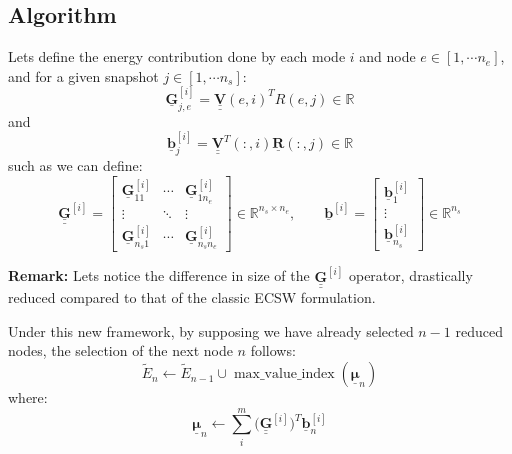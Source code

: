 \documentclass[a4paper,12pt]{article}
\newcommand{\vect}[1]{\underline{\boldsymbol{#1}}}
\newcommand{\matr}[1]{\underline{\underline{\boldsymbol{#1}}}}
\begin{document}
\subsection{Algorithm}
Lets define the energy contribution done by each mode $i$ and node $e\in[1,\cdots n_e]$, and for a given snapshot $j\in[1,\cdots n_s]$:
\begin{equation}
\vect{G}_{j,e}^{[i]}=\matr{V}(e,i)^{T}R(e,j)\in\mathbb{R}
\label{eq:bm-node-contribution}
\end{equation}
and
\begin{equation}
\vect{b}_j^{[i]}=\matr{V}^{T}(:,i)\vect{R}(:,j)\in\mathbb{R}
\label{eq:bm-target}
\end{equation}
such as we can define:
\[
\matr{G}^{[i]}=
\begin{bmatrix}
\vect{G}_{11}^{[i]} & \cdots & \vect{G}_{1n_e}^{[i]}\\
\vdots & \ddots & \vdots\\
\vect{G}_{n_s1}^{[i]} & \cdots & \vect{G}_{n_sn_e}^{[i]}
\end{bmatrix}
\in\mathbb{R}^{n_s\times n_e},
\qquad
\vect{b}^{[i]}=
\begin{bmatrix}
\vect{b}_1^{[i]}\\
\vdots\\
\vect{b}_{n_s}^{[i]}
\end{bmatrix}
\in\mathbb{R}^{n_s}
\]

\noindent\textbf{Remark:} Lets notice the difference in size of the $\matr{G}^{[i]}$ operator, drastically reduced compared to that of the classic ECSW formulation.


Under this new framework, by supposing we have already selected $n-1$ reduced nodes, the selection of the next node $n$ follows:
\begin{equation}
\widetilde{E}_n\leftarrow
\widetilde{E}_{n-1}\cup
\operatorname{max\_value\_index}(\vect{\mu}_n)
\label{eq:bm-select}
\end{equation}
where:
\begin{equation}
\vect{\mu}_n\leftarrow\sum_i^m\bigl(\matr{G}^{[i]}\bigr)^T\vect{b}_n^{[i]}
\label{eq:bm-score}
\end{equation}
\end{document}
